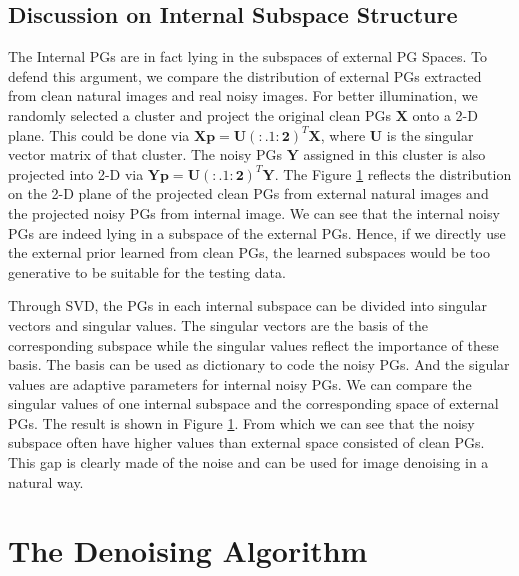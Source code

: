 \documentclass[10pt,twocolumn,letterpaper]{article}
\begin{document}
\subsection{Discussion on Internal Subspace Structure}
The Internal PGs are in fact lying in the subspaces of external PG Spaces. To defend this argument, we compare the distribution of external PGs extracted from clean natural images and real noisy images. For better illumination, we randomly selected a cluster and project the original clean PGs $\mathbf{X}$ onto a 2-D plane. This could be done via $\mathbf{Xp}=\mathbf{U(:.1:2)}^{T}\mathbf{X}$, where $\mathbf{U}$ is the singular vector matrix of that cluster. The noisy PGs $\mathbf{Y}$ assigned in this cluster is also projected into 2-D via $\mathbf{Yp}=\mathbf{U(:.1:2)}^{T}\mathbf{Y}$. The Figure \ref{} reflects the distribution on the 2-D plane of the projected clean PGs from external natural images and the projected noisy PGs from internal image. We can see that the internal noisy PGs are indeed lying in a subspace of the external PGs. Hence, if we directly use the external prior learned from clean PGs, the learned subspaces would be too generative to be suitable for the testing data. 

Through SVD, the PGs in each internal subspace can be divided into singular vectors and singular values. The singular vectors are the basis of the corresponding subspace while the singular values reflect the importance of these basis. The basis can be used as dictionary to code the noisy PGs. And the sigular values are adaptive parameters for internal noisy PGs. We can compare the singular values of one internal subspace and the corresponding space of external PGs. The result is shown in Figure \ref{}. From which we can see that the noisy subspace often have higher values than external space consisted of clean PGs. This gap is clearly made of the noise and can be used for image denoising in a natural way.


\section{The Denoising Algorithm}
\end{document}
